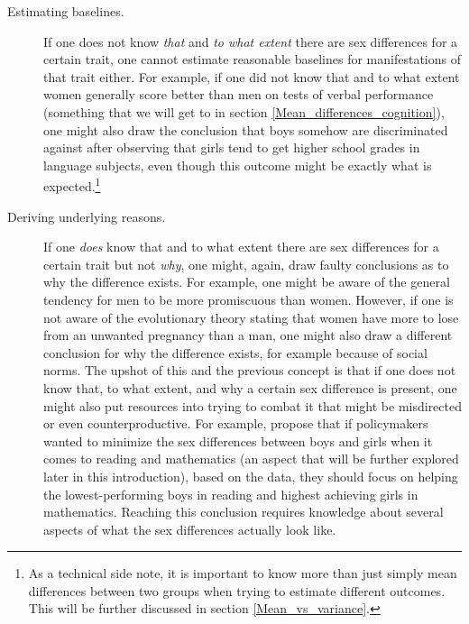 \begin{description} \item [Estimating baselines.] If one does not know \emph{that} and \emph{to what extent} there are sex differences for a certain trait, one cannot estimate reasonable baselines for manifestations of that trait either. For example, if one did not know that and to what extent women generally score better than men on tests of verbal performance (something that we will get to in section \ref{Mean_differences_cognition}), one might also draw the conclusion that boys somehow are discriminated against after observing that girls tend to get higher school grades in language subjects, even though this outcome might be exactly what is expected.\footnote{As a technical side note, it is important to know more than just simply mean differences between two groups when trying to estimate different outcomes. This will be further discussed in section \ref{Mean_vs_variance}.}

\item [Deriving underlying reasons.] If one \emph{does} know that and to what extent there are sex differences for a certain trait but not \emph{why}, one might, again, draw faulty conclusions as to why the difference exists. For example, one might be aware of the general tendency for men to be more promiscuous than women. However, if one is not aware of the evolutionary theory stating that women have more to lose from an unwanted pregnancy than a man, one might also draw a different conclusion for why the difference exists, for example because of social norms. The upshot of this and the previous concept is that if one does not know that, to what extent, and why a certain sex difference is present, one might also put resources into trying to combat it that might be misdirected or even counterproductive. For example, \textcite{Stoet2013} propose that if policymakers wanted to minimize the sex differences between boys and girls when it comes to reading and mathematics (an aspect that will be further explored later in this introduction), based on the data, they should focus on helping the lowest-performing boys in reading and highest achieving girls in mathematics. Reaching this conclusion requires knowledge about several aspects of what the sex differences actually look like.


\end{description}
